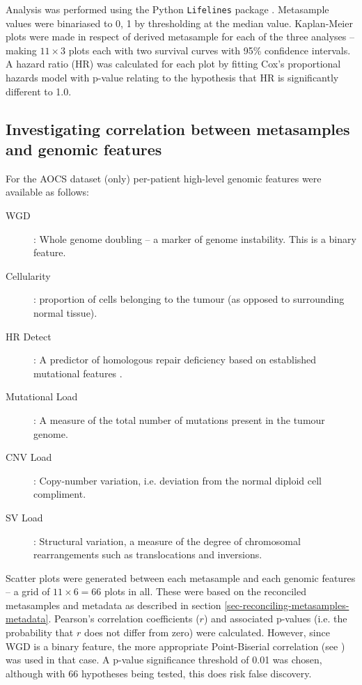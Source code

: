 \documentclass[tikz, 12pt,a4paper,oneside,fleqn]{article}
\begin{document}
Analysis was performed using the Python {\tt Lifelines} package \cite{Davidson-Pilon2020}.  %
Metasample values were binariased to 0, 1 by thresholding at the median value.   Kaplan-Meier plots were made in respect of derived metasample for each of the three analyses -- making $11 \times 3$ plots each with two survival curves with 95\% confidence intervals.  A hazard ratio (HR)
was calculated for each plot by fitting Cox's proportional hazards model with p-value relating to the hypothesis that HR is significantly different to 1.0.


\subsection{Investigating correlation between metasamples and genomic features}
\label{sec-genomic-features}

For the AOCS dataset (only) per-patient high-level genomic features were available as follows:
\begin{description}
\item[WGD]: Whole genome doubling -- a marker of genome instability.  This is a binary feature.
\item[Cellularity]: proportion of cells belonging to the tumour (as opposed to surrounding normal tissue).
\item[HR Detect]: A predictor of homologous repair deficiency based on established mutational features \cite{Ewing2020}.
\item[Mutational Load]: A measure of the total number of mutations present in the tumour genome.
\item[CNV Load]: Copy-number variation, i.e. deviation from the normal diploid cell compliment.
\item[SV Load]: Structural variation, a measure of the degree of chromosomal rearrangements such as translocations and inversions.
\end{description}

Scatter plots were generated between each metasample and each genomic features -- a grid of $11 \times 6 = 66$ plots in all.  These were based on the reconciled metasamples and metadata as described in section \ref{sec-reconciling-metasamples-metadata}.  Pearson's correlation coefficients ($r$) and associated p-values (i.e. the probability that $r$ does not differ from zero) were calculated.   However, since WGD is a binary feature, the more appropriate Point-Biserial correlation (see \cite{Wikipediab}) was used in that case.  A p-value significance threshold of 0.01 was chosen, although with 66 hypotheses being tested, this does risk false discovery.
\end{document}

